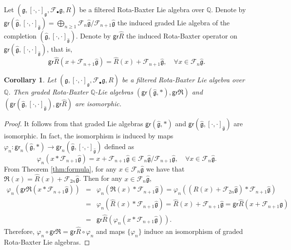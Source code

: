 \documentclass[12pt]{amsart}
\newtheorem{cor}[thm]{Corollary}
\theoremstyle{definition}   %
\newtheorem{ex}[thm]{Example}
\newcommand{\gr}{\mathsf{gr}}
\newcommand{\g}{\mathfrak g}
\newcommand{\huaF}{\mathcal{F}}
\newcommand{\frkR}{\mathfrak R}
\begin{document}
Let  $(\g,[\cdot,\cdot]_\g,\huaF_{\bullet}\g,R)$ be a filtered Rota-Baxter Lie algebra over $\mathbb Q$. Denote by $\gr(\widehat{\g},[\cdot,\cdot]_{\widehat{\g}})=\bigoplus\limits_{n\geq 1}\huaF_n\widehat{\g}/\huaF_{n+1}\widehat{\g}$ the induced graded Lie algebra of the completion $(\widehat{\g},[\cdot,\cdot]_{\widehat{\g}}).$ Denote by $\gr\widehat{R}$ the induced Rota-Baxter operator on $\gr(\widehat{\g},[\cdot,\cdot]_{\widehat{\g}})$, that is, $$\gr\widehat{R}(x+\huaF_{n+1}\widehat{\g})=\widehat{R}(x)+\huaF_{n+1}\widehat{\g},\quad \forall x\in \huaF_n\widehat{\g}.$$



\begin{cor}
  Let  $(\g,[\cdot,\cdot]_\g,\huaF_{\bullet}\g,R)$ be a filtered Rota-Baxter Lie algebra over $\mathbb Q$. Then graded Rota-Baxter $\mathbb Q$-Lie algebras $(\gr(\widehat{\g},*),\gr\frkR)$ and  $(\gr(\widehat{\g},[\cdot,\cdot]_{\widehat{\g}}),\gr\widehat{R})$ are isomorphic.
\end{cor}
\begin{proof}
  It follows from  \cite[Proposition 2.8]{Quillen} that graded Lie algebras $\gr(\widehat{\g},*)$ and $\gr(\widehat{\g},[\cdot,\cdot]_{\widehat{\g}})$ are isomorphic. In fact, the isomorphism is induced by maps $\varphi_n:\gr_n(\widehat{\g},*)\rightarrow \gr_n(\widehat{\g},[\cdot,\cdot]_{\widehat{\g}})$ defined as
$$
\varphi_n(x*\huaF_{n+1}\widehat{\g})=x+\huaF_{n+1}\widehat{\g}\in \huaF_n\widehat{\g}/\huaF_{n+1}\widehat{\g},\quad \forall x\in \huaF_n \widehat{\g}.
$$
From Theorem \ref{thm:formula}, for any $x\in \huaF_n\widehat{\g}$ we have that $\frkR(x)=\widehat{R}(x)+\huaF_{2n}{\widehat{\g}}$. Then for any $x\in \huaF_n \widehat{\g}$,
\begin{eqnarray*}
\varphi_n(\gr\frkR(x*\huaF_{n+1}\widehat{\g}))&=&\varphi_n(\frkR(x)*\huaF_{n+1}\widehat{\g})=\varphi_n((R(x)+\huaF_{2n}\widehat{\g})*\huaF_{n+1}\widehat{\g})
\\
&=& \varphi_n(\widehat{R}(x)*\huaF_{n+1}\widehat{\g})=\widehat{R}(x)+\huaF_{n+1}\widehat{\g}=\gr\widehat{R}(x+\huaF_{n+1}\widehat{\g})\\
&=&\gr\widehat{R}(\varphi_n(x*\huaF_{n+1}\widehat{\g})).
\end{eqnarray*}
Therefore, $\varphi_n\circ \gr\frkR=\gr\widehat{R}\circ \varphi_n$ and maps $\{\varphi_n\}$ induce an isomorphism of  graded Rota-Baxter Lie algebras.
\end{proof}

\end{document}
